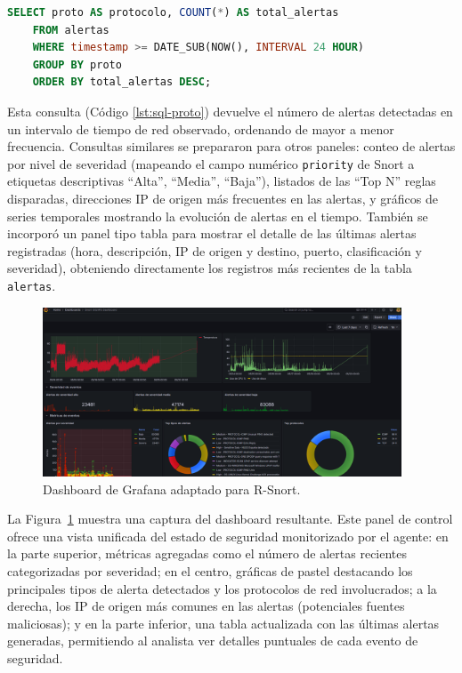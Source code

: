 \documentclass[11pt,a4paper,twoside]{report}
\begin{document}
\begin{lstlisting}[language=SQL, caption={Consulta SQL (simplificada) para panel de protocolos en Grafana}, label={lst:sql-proto}]
	SELECT proto AS protocolo, COUNT(*) AS total_alertas
	FROM alertas
	WHERE timestamp >= DATE_SUB(NOW(), INTERVAL 24 HOUR)
	GROUP BY proto
	ORDER BY total_alertas DESC;
\end{lstlisting}

Esta consulta (Código \ref{lst:sql-proto}) devuelve el número de alertas detectadas en un intervalo de tiempo de red observado, ordenando de mayor a menor frecuencia. Consultas similares se prepararon para otros paneles: conteo de alertas por nivel de severidad (mapeando el campo numérico \texttt{priority} de Snort a etiquetas descriptivas “Alta”, “Media”, “Baja”), listados de las “Top N” reglas disparadas, direcciones IP de origen más frecuentes en las alertas, y gráficos de series temporales mostrando la evolución de alertas en el tiempo. También se incorporó un panel tipo tabla para mostrar el detalle de las últimas alertas registradas (hora, descripción, IP de origen y destino, puerto, clasificación y severidad), obteniendo directamente los registros más recientes de la tabla \texttt{alertas}.

\begin{figure}[htb]
	\centering
	\includegraphics[width=0.95\textwidth]{documento/grafana1.png}
	\caption{Dashboard de Grafana adaptado para R-Snort.}
	\label{fig:grafana-dashboard}
\end{figure}

La Figura~\ref{fig:grafana-dashboard} muestra una captura del dashboard resultante. Este panel de control ofrece una vista unificada del estado de seguridad monitorizado por el agente: en la parte superior, métricas agregadas como el número de alertas recientes categorizadas por severidad; en el centro, gráficas de pastel destacando los principales tipos de alerta detectados y los protocolos de red involucrados; a la derecha, los IP de origen más comunes en las alertas (potenciales fuentes maliciosas); y en la parte inferior, una tabla actualizada con las últimas alertas generadas, permitiendo al analista ver detalles puntuales de cada evento de seguridad.\newline
\end{document}
